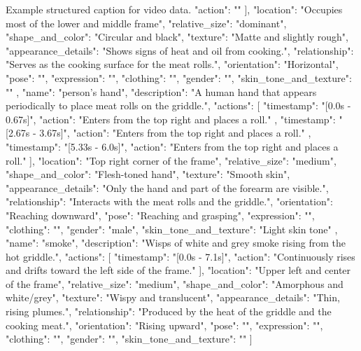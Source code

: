 \begin{captionexample}{Example structured caption for video data.}
{{{          "action": ""
        }
      ],
      "location": "Occupies most of the lower and middle frame",
      "relative_size": "dominant",
      "shape_and_color": "Circular and black",
      "texture": "Matte and slightly rough",
      "appearance_details": "Shows signs of heat and oil from cooking.",
      "relationship": "Serves as the cooking surface for the meat rolls.",
      "orientation": "Horizontal",
      "pose": "",
      "expression": "",
      "clothing": "",
      "gender": "",
      "skin_tone_and_texture": ""
    },
    {
      "name": "person's hand",
      "description": "A human hand that appears periodically to place meat rolls on the griddle.",
      "actions": [
        {
          "timestamp": "[0.0s - 0.67s]",
          "action": "Enters from the top right and places a roll."
        },
        {
          "timestamp": "[2.67s - 3.67s]",
          "action": "Enters from the top right and places a roll."
        },
        {
          "timestamp": "[5.33s - 6.0s]",
          "action": "Enters from the top right and places a roll."
        }
      ],
      "location": "Top right corner of the frame",
      "relative_size": "medium",
      "shape_and_color": "Flesh-toned hand",
      "texture": "Smooth skin",
      "appearance_details": "Only the hand and part of the forearm are visible.",
      "relationship": "Interacts with the meat rolls and the griddle.",
      "orientation": "Reaching downward",
      "pose": "Reaching and grasping",
      "expression": "",
      "clothing": "",
      "gender": "male",
      "skin_tone_and_texture": "Light skin tone"
    },
    {
      "name": "smoke",
      "description": "Wisps of white and grey smoke rising from the hot griddle.",
      "actions": [
        {
          "timestamp": "[0.0s - 7.1s]",
          "action": "Continuously rises and drifts toward the left side of the frame."
        }
      ],
      "location": "Upper left and center of the frame",
      "relative_size": "medium",
      "shape_and_color": "Amorphous and white/grey",
      "texture": "Wispy and translucent",
      "appearance_details": "Thin, rising plumes.",
      "relationship": "Produced by the heat of the griddle and the cooking meat.",
      "orientation": "Rising upward",
      "pose": "",
      "expression": "",
      "clothing": "",
      "gender": "",
      "skin_tone_and_texture": ""
    }
  ]
}
\end{captionexample}

